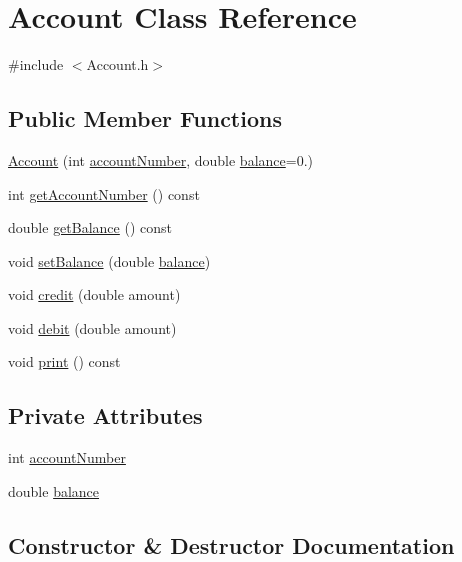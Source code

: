 \hypertarget{classAccount}{}\section{Account Class Reference}
\label{classAccount}


{\ttfamily \#include $<$Account.\+h$>$}

\subsection*{Public Member Functions}
\begin{DoxyCompactItemize}
\item 
\hyperlink{classAccount_afde15ac73873bd15583c45db12bde2b3}{Account} (int \hyperlink{classAccount_a92e2552bc9214e93070df37a483fcc1a}{account\+Number}, double \hyperlink{classAccount_a6e41f403b4813738ba835377f212de33}{balance}=0.)
\item 
int \hyperlink{classAccount_aab90becddea7d42ad801ea031c603b80}{get\+Account\+Number} () const 
\item 
double \hyperlink{classAccount_a73bfb6b16b4c29f621e3f3ddc081dc83}{get\+Balance} () const 
\item 
void \hyperlink{classAccount_ac426f0df93883712c99b224645748d67}{set\+Balance} (double \hyperlink{classAccount_a6e41f403b4813738ba835377f212de33}{balance})
\item 
void \hyperlink{classAccount_ab39def1adefa79491042c8a18e4268e0}{credit} (double amount)
\item 
void \hyperlink{classAccount_a3f13036bfe5d033e9664df38724eb2be}{debit} (double amount)
\item 
void \hyperlink{classAccount_a46e741ac1a3b502e3a9411ef9ff1c0a7}{print} () const 
\end{DoxyCompactItemize}
\subsection*{Private Attributes}
\begin{DoxyCompactItemize}
\item 
int \hyperlink{classAccount_a92e2552bc9214e93070df37a483fcc1a}{account\+Number}
\item 
double \hyperlink{classAccount_a6e41f403b4813738ba835377f212de33}{balance}
\end{DoxyCompactItemize}


\subsection{Constructor \& Destructor Documentation}
